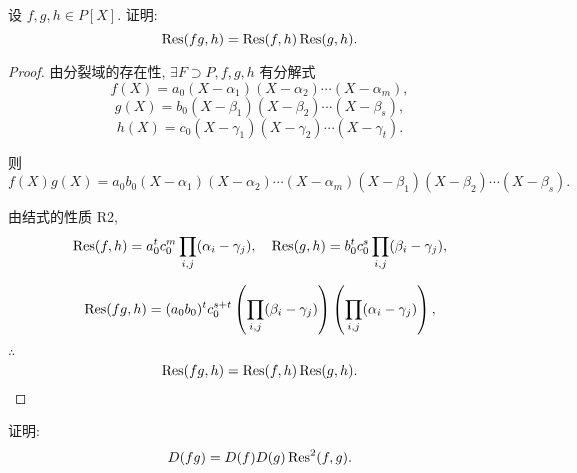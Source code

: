 \documentclass[color=black,device=normal,lang=cn,mode=geye]{elegantnote}
\begin{document}
\begin{exercise}\label{ex2.5}
    设 $f,g,h\in P[X]$. 证明:
    \[\operatorname{Res} (fg,h)=\operatorname{Res} (f,h)\operatorname{Res} (g,h).\]
\end{exercise}
\begin{proof}
    由分裂域的存在性, $\exists F\supset P,f,g,h$ 有分解式
    \[f(X)=a_0(X-\alpha_1)(X-\alpha_2)\cdots(X-\alpha_m),\]
    \[g(X)=b_0(X-\beta_1)(X-\beta_2)\cdots(X-\beta_s),\]
    \[h(X)=c_0(X-\gamma_1)(X-\gamma_2)\cdots(X-\gamma_t).\]

    则
    \[f(X)g(X)=a_0b_0(X-\alpha_1)(X-\alpha_2)\cdots(X-\alpha_m)(X-\beta_1)(X-\beta_2)\cdots(X-\beta_s).\]

    由结式的性质 R2,
    \[\operatorname{Res} (f,h)=a_0^tc_0^m\prod\limits_{i,j}(\alpha_i-\gamma_j),\quad\operatorname{Res} (g,h)=b_0^tc_0^s\prod\limits_{i,j}(\beta_i-\gamma_j),\]
    
    \[\operatorname{Res} (fg,h)=(a_0b_0)^tc_0^{s+t}\left(\prod\limits_{i,j}(\beta_i-\gamma_j)\right)\left(\prod\limits_{i,j}(\alpha_i-\gamma_j)\right),\]

    $\therefore$
    \[\operatorname{Res} (fg,h)=\operatorname{Res} (f,h)\operatorname{Res} (g,h).\qedhere\]
\end{proof}
\begin{exercise}%
    证明:
    \[D(fg)=D(f)D(g)\operatorname{Res} ^2(f,g).\]
\end{exercise}
\end{document}
